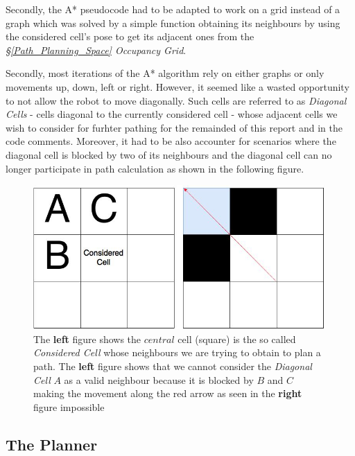 \documentclass[11pt, a4paper]{article}
\begin{document}
Secondly, the A* pseudocode had to be adapted to work on a grid instead of a graph which was solved by a simple function obtaining its neighbours by using the considered cell's pose to get its adjacent ones from the \textit{\S\ref{Path_Planning_Space} Occupancy Grid}.

Secondly, most iterations of the A* algorithm rely on either graphs\cite{path_astar_grid_no_grid}  or only movements up, down, left or right\cite{path_astar_grid_no_diagonals}. However, it seemed like a wasted opportunity to not allow the robot to move diagonally. Such cells are referred to as  \textit{Diagonal Cells} - cells diagonal to the currently considered cell - whose adjacent cells we wish to consider for furhter pathing for the remainded of this report and in the code comments. Moreover, it had to be also accounter for scenarios where the diagonal cell is blocked by two of its neighbours and the diagonal cell can no longer participate in path calculation as shown in the following figure.


\begin{figure}[H]
	  \caption{The \textbf{left} figure shows the $central$ cell (square) is the so called \textit{Considered Cell} whose neighbours we are trying to obtain to plan a path. The \textbf{left} figure shows that we cannot consider the \textit{Diagonal Cell} $A$ as a valid neighbour because it is blocked by $B$ and $C$ making the movement along the red arrow as seen in the \textbf{right} figure impossible}
 	  \centering
	  \includegraphics[width=30em]{../assets/fig_astar_diagonal.jpg}
\end{figure} 









\subsection{The Planner}
\end{document}
